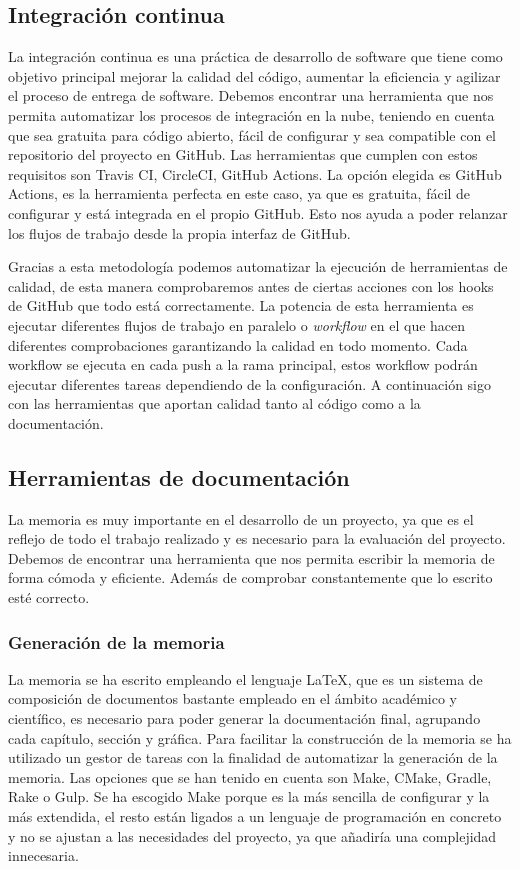\subsection{Integración continua}
La integración continua es una práctica de desarrollo de software que tiene como objetivo principal mejorar la calidad del código, aumentar la eficiencia y agilizar el proceso de entrega de software.
Debemos encontrar una herramienta que nos permita automatizar los procesos de integración en la nube, teniendo en cuenta que sea gratuita para código abierto, fácil de configurar y sea compatible con el repositorio del proyecto en GitHub.
Las herramientas que cumplen con estos requisitos son Travis CI, CircleCI, GitHub Actions. La opción elegida es GitHub Actions, es la herramienta perfecta en este caso, ya que es gratuita, fácil de configurar y está integrada en el propio GitHub.
Esto nos ayuda a poder relanzar los flujos de trabajo desde la propia interfaz de GitHub.

Gracias a esta metodología podemos automatizar la ejecución de herramientas de calidad, de esta manera comprobaremos antes de ciertas acciones con los hooks de GitHub que todo está correctamente.
La potencia de esta herramienta es ejecutar diferentes flujos de trabajo en paralelo o \textit{workflow} en el que hacen diferentes comprobaciones garantizando la calidad en todo momento.
Cada workflow se ejecuta en cada push a la rama principal, estos workflow podrán ejecutar diferentes tareas dependiendo de la configuración.
A continuación sigo con las herramientas que aportan calidad tanto al código como a la documentación.

\subsection{Herramientas de documentación}
La memoria es muy importante en el desarrollo de un proyecto, ya que es el reflejo de todo el trabajo realizado y es necesario para la evaluación del proyecto.
Debemos de encontrar una herramienta que nos permita escribir la memoria de forma cómoda y eficiente. Además de comprobar constantemente que lo escrito esté correcto.

\subsubsection{Generación de la memoria}
La memoria se ha escrito empleando el lenguaje LaTeX, que es un sistema de composición de documentos bastante empleado
en el ámbito académico y científico, es necesario para poder generar la documentación final, agrupando cada capítulo, sección y
gráfica. Para facilitar la construcción de la memoria se ha utilizado un gestor de tareas con la finalidad de automatizar la generación de la memoria.
Las opciones que se han tenido en cuenta son Make, CMake, Gradle, Rake o Gulp. Se ha escogido Make porque es la más sencilla de configurar y la más extendida, el resto
están ligados a un lenguaje de programación en concreto y no se ajustan a las necesidades del proyecto, ya que añadiría una complejidad innecesaria.

